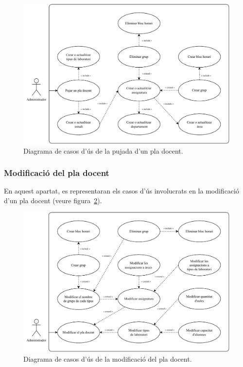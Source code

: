 \documentclass[a4paper,12pt]{ThesisStyle}
\begin{document}
\begin{figure}[H]
  \centering
  \includegraphics[width=\textwidth]{assets/use_cases/pla_docent/pujada.pdf}
  \caption{\label{img:casos_us_pla_pujada}Diagrama de casos d'ús de la pujada d'un pla docent.}
\end{figure}

\newpage

\subsubsection{Modificació del pla docent}

En aquest apartat, es representaran els casos d'ús involucrats en la modificació d'un pla docent (veure figura~\ref{img:casos_us_pla_modif}).

\begin{figure}[H]
  \centering
  \includegraphics[width=\textwidth]{assets/use_cases/pla_docent/modif.pdf}
  \caption{\label{img:casos_us_pla_modif}Diagrama de casos d'ús de la modificació del pla docent.}
\end{figure}
\end{document}
